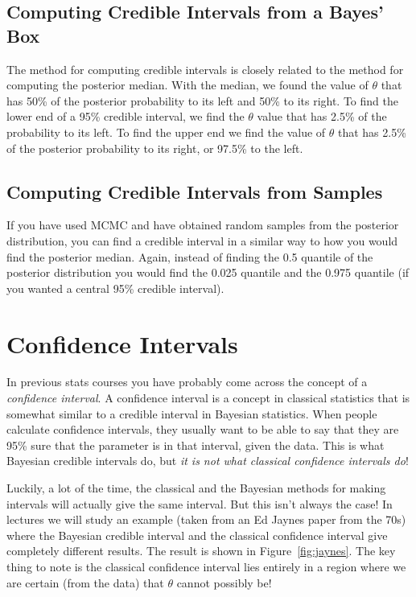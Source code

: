 \subsection{Computing Credible Intervals from a Bayes' Box}
The method for computing credible intervals is closely related to the method
for computing the posterior median. With the median, we found the value of
$\theta$ that has 50\% of the posterior probability to its left and 50\% to its
right. To find the lower end of a 95\% credible interval, we find the $\theta$
value that has 2.5\% of the probability to its left. To find the upper end we
find the value of $\theta$ that has 2.5\% of the posterior probability to its
right, or 97.5\% to the left.

\subsection{Computing Credible Intervals from Samples}
If you have used MCMC and have obtained random samples from the posterior
distribution, you can find a credible interval in a similar way to how you would
find the posterior median. Again, instead of finding the 0.5 quantile of the
posterior distribution you would find the 0.025 quantile and the 0.975 quantile
(if you wanted a central 95\% credible interval).

\section{Confidence Intervals}
In previous stats courses you have probably come across the concept of a
{\it confidence interval}. A confidence interval is a concept in classical
statistics that is somewhat similar to a credible interval in Bayesian statistics.
When people calculate confidence intervals, they usually want to be
able to say that they are 95\% sure that the parameter is in that interval,
given the data. This is what Bayesian credible intervals do, but {\it it is not
what classical confidence intervals do}!

Luckily, a lot of the time, the classical and the Bayesian methods for making
intervals will actually give the same interval. But this isn't always the case!
In lectures we will study an example (taken from an Ed Jaynes paper from the
70s)
where the Bayesian credible interval and
the classical confidence interval give completely different results. The result
is shown in Figure~\ref{fig:jaynes}. The key thing to note is the classical
confidence interval lies entirely in a region where we are certain
(from the data) that $\theta$ cannot possibly be!

